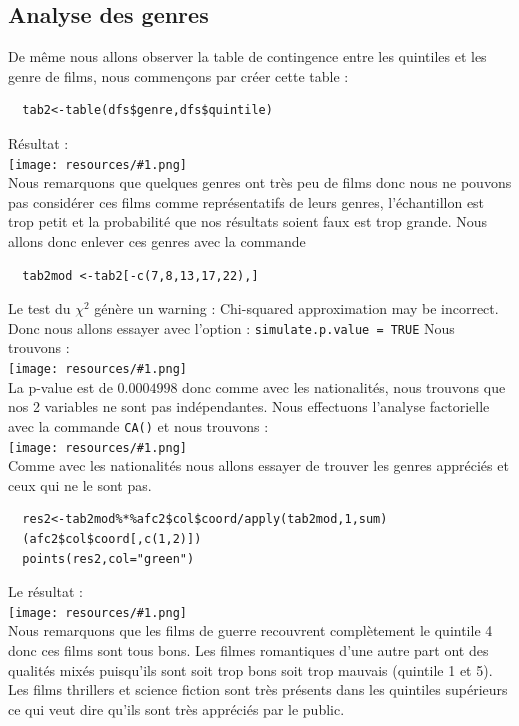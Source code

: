 \documentclass{report}
\newcommand{\photo}[1]{\\
    \texttt{[image: resources/\#1.png]}
\\
}
\begin{document}
\subsection{Analyse des genres}
De même nous allons observer la table de contingence entre les quintiles et les genre de films,
nous commençons par créer cette table :
\begin{verbatim}
  tab2<-table(dfs$genre,dfs$quintile)
\end{verbatim}
Résultat :
\photo{35}
Nous remarquons que quelques genres ont très peu de films donc nous ne pouvons pas considérer
ces films comme représentatifs de leurs genres, l'échantillon est trop petit et la probabilité que
nos résultats soient faux est trop grande.
Nous allons donc enlever ces genres avec la commande
\begin{verbatim}
  tab2mod <-tab2[-c(7,8,13,17,22),]
\end{verbatim}
Le test du $\chi^2$ génère un warning : Chi-squared approximation may be incorrect.\\
Donc nous allons essayer avec l'option : \texttt{simulate.p.value = TRUE}
Nous trouvons :
\photo{37}
La p-value est de  $0.0004998$ donc comme avec les nationalités, nous trouvons que nos 2 variables
ne sont pas indépendantes.
Nous effectuons l'analyse factorielle avec la commande \texttt{CA()} et nous trouvons :
\photo{38}
Comme avec les nationalités nous allons essayer de trouver les genres appréciés et ceux qui ne le
sont pas.
\begin{verbatim}
  res2<-tab2mod%*%afc2$col$coord/apply(tab2mod,1,sum)
  (afc2$col$coord[,c(1,2)])
  points(res2,col="green")
\end{verbatim}
Le résultat :
\photo{39}
Nous remarquons que les films de guerre recouvrent complètement le quintile 4 donc ces films sont tous
bons. Les filmes romantiques d'une autre part ont des qualités mixés puisqu'ils sont soit trop bons
soit trop mauvais (quintile 1 et 5). Les films thrillers et science fiction  sont très présents dans
les quintiles supérieurs ce qui veut dire qu'ils sont très appréciés par le public.
\end{document}

